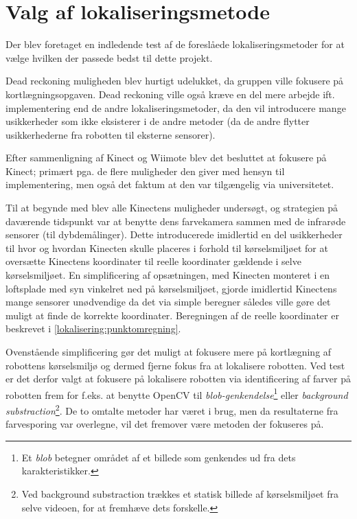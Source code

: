 \section{Valg af lokaliseringsmetode}\label{lokalisering:valg}
Der blev foretaget en indledende test af de foreslåede lokaliseringsmetoder for at vælge hvilken der passede bedst til dette projekt.

Dead reckoning muligheden blev hurtigt udelukket, da gruppen ville fokusere på kortlægningsopgaven.
Dead reckoning ville også kræve en del mere arbejde ift. implementering end de andre lokaliseringsmetoder, da den vil introducere mange usikkerheder som ikke eksisterer i de andre metoder (da de andre flytter usikkerhederne fra robotten til eksterne sensorer).

Efter sammenligning af Kinect og Wiimote blev det besluttet at fokusere på Kinect; primært pga. de flere muligheder den giver med hensyn til implementering, men også det faktum at den var tilgængelig via universitetet.

Til at begynde med blev alle Kinectens muligheder undersøgt, og strategien på daværende tidspunkt var at benytte dens farvekamera sammen med de infrarøde sensorer (til dybdemålinger). 
Dette introducerede imidlertid en del usikkerheder til hvor og hvordan Kinecten skulle placeres i forhold til kørselsmiljøet for at oversætte Kinectens koordinater til reelle koordinater gældende i selve kørselsmiljøet.
En simplificering af opsætningen, med Kinecten monteret i en loftsplade med syn vinkelret ned på kørselsmiljøet, gjorde imidlertid Kinectens mange sensorer unødvendige da det via simple beregner således ville gøre det muligt at finde de korrekte koordinater.
Beregningen af de reelle koordinater er beskrevet i \cref{lokalisering:punktomregning}.

Ovenstående simplificering gør det muligt at fokusere mere på kortlægning af robottens kørselsmiljø og dermed fjerne fokus fra at lokalisere robotten.
Ved test er det derfor valgt at fokusere på lokalisere robotten via identificering af farver på robotten frem for f.eks. at benytte OpenCV til \textit{blob-genkendelse}\footnote{Et \textit{blob} betegner området af et billede som genkendes ud fra dets karakteristikker.} eller \textit{background substraction}\footnote{Ved background substraction trækkes et statisk billede af kørselsmiljøet fra selve videoen, for at fremhæve dets forskelle.}.
De to omtalte metoder har været i brug, men da resultaterne fra farvesporing var overlegne, vil det fremover være metoden der fokuseres på.


